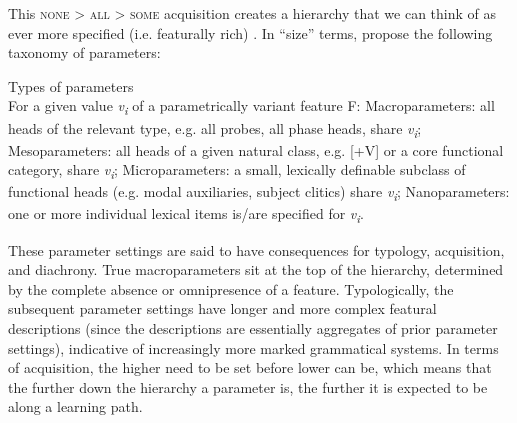 \documentclass[output=paper]{langsci/langscibook}
\begin{document}
\begin{exe}
    \ex\label{bkm:Ref347566517}\label{ex:vdwal:3.5}%
\end{exe}

This \textsc{none > all > some} acquisition creates a hierarchy that we can think of as
ever more specified (i.e. featurally rich) . In “size” terms,
\textcite{BibRob2015,BibRob2016} propose the following taxonomy of parameters:

\ea\label{ex:vdwal:3.6} Types of parameters\\
    For a given value \emph{v\textsubscript{i}} of a parametrically variant
    feature F:
    \ea Macroparameters: all heads of the relevant type, e.g. all probes, all
    phase heads, share \emph{v\textsubscript{i}};
    \ex Mesoparameters: all heads of a given natural class, e.g. [+V] or a core
    functional category, share \emph{v\textsubscript{i}};
    \ex Microparameters: a small, lexically definable subclass of functional
    heads (e.g. modal auxiliaries, subject clitics) share
    \emph{v\textsubscript{i}};
    \ex Nanoparameters: one or more individual lexical items is/are specified
    for \emph{v\textsubscript{i}}.
    \z
\z

These parameter settings are said to have consequences for typology,
acquisition, and diachrony. True macroparameters sit at the top of the
hierarchy, determined by the complete absence or omnipresence of a feature.
Typologically, the subsequent parameter settings have longer and more complex
featural descriptions (since the descriptions are essentially aggregates of
prior parameter settings), indicative of increasingly more marked grammatical
systems. In terms of acquisition, the higher  need to be set before
lower  can be, which means that the further down the hierarchy a
parameter is, the further it is expected to be along a learning path.
\end{document}
